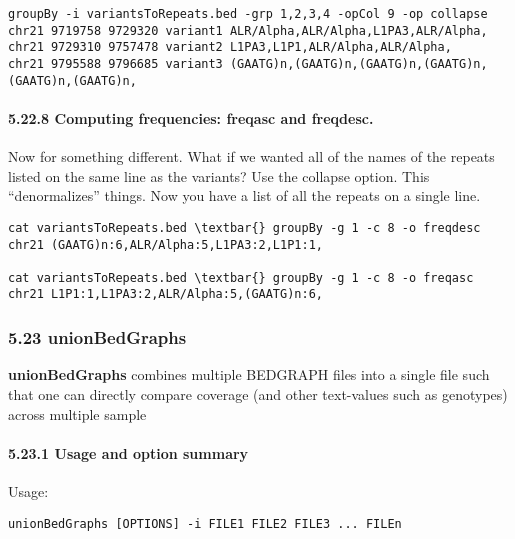 \documentclass[letterpaper,10pt,english]{sphinxmanual}
\begin{document}
\begin{Verbatim}[commandchars=\\\{\}]
groupBy -i variantsToRepeats.bed -grp 1,2,3,4 -opCol 9 -op collapse
chr21 9719758 9729320 variant1 ALR/Alpha,ALR/Alpha,L1PA3,ALR/Alpha,
chr21 9729310 9757478 variant2 L1PA3,L1P1,ALR/Alpha,ALR/Alpha,
chr21 9795588 9796685 variant3 (GAATG)n,(GAATG)n,(GAATG)n,(GAATG)n,(GAATG)n,(GAATG)n,
\end{Verbatim}


\paragraph{5.22.8 Computing frequencies: freqasc and freqdesc.}
\label{content/groupBy:computing-frequencies-freqasc-and-freqdesc}
Now for something different. What if we wanted all of the names of the repeats listed on the same line
as the variants? Use the collapse option. This ``denormalizes'' things. Now you have a list of all the
repeats on a single line.

\begin{Verbatim}[commandchars=\\\{\}]
cat variantsToRepeats.bed \textbar{} groupBy -g 1 -c 8 -o freqdesc
chr21 (GAATG)n:6,ALR/Alpha:5,L1PA3:2,L1P1:1,

cat variantsToRepeats.bed \textbar{} groupBy -g 1 -c 8 -o freqasc
chr21 L1P1:1,L1PA3:2,ALR/Alpha:5,(GAATG)n:6,
\end{Verbatim}


\subsubsection{5.23 unionBedGraphs}
\label{content/unionBedGraphs:unionbedgraphs}\label{content/unionBedGraphs::doc}
\textbf{unionBedGraphs} combines multiple BEDGRAPH files into a single file such that one can directly
compare coverage (and other text-values such as genotypes) across multiple sample


\paragraph{5.23.1 Usage and option summary}
\label{content/unionBedGraphs:usage-and-option-summary}
Usage:

\begin{Verbatim}[commandchars=\\\{\}]
unionBedGraphs [OPTIONS] -i FILE1 FILE2 FILE3 ... FILEn
\end{Verbatim}
\end{document}
